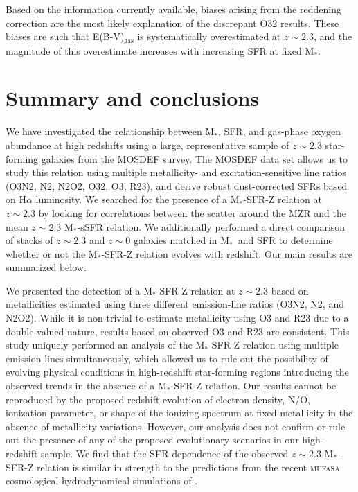 \documentclass[iop,twocolappendix]{emulateapj}
\newcommand{\mstar}{$\mbox{M}_*$}
\begin{document}
Based on the information currently available, biases arising from the reddening correction
 are the most likely explanation of the discrepant O32 results.  These biases are such that
 E(B-V)$_{\text{gas}}$ is systematically overestimated at $z\sim2.3$, and the magnitude of this overestimate
 increases with increasing SFR at fixed \mstar.

\section{Summary and conclusions}\label{sec5}

We have investigated the relationship between \mstar, SFR, and gas-phase oxygen abundance
 at high redshifts using a large, representative sample of $z\sim2.3$ star-forming galaxies from the
 MOSDEF survey.  The MOSDEF data set allows us to study this relation using multiple
 metallicity- and excitation-sensitive line ratios (O3N2, N2, N2O2, O32, O3, R23), and
 derive robust dust-corrected SFRs based on H$\alpha$ luminosity.
  We searched for the presence of a \mstar-SFR-Z relation at $z\sim2.3$ by looking for
 correlations between the scatter around the MZR and the mean $z\sim2.3$ \mstar-sSFR
 relation.  We additionally performed a direct comparison of stacks of $z\sim2.3$ and $z\sim0$
 galaxies matched in \mstar\ and SFR to determine whether or not the \mstar-SFR-Z relation
 evolves with redshift.  Our main results are summarized below.

We presented the detection of a \mstar-SFR-Z relation at $z\sim2.3$ based on
 metallicities estimated using three different emission-line ratios (O3N2, N2, and N2O2).
  While it is non-trivial to estimate metallicity using O3 and R23 due to a double-valued nature,
 results based on observed O3 and R23 are consistent.
  This study uniquely performed an analysis of the \mstar-SFR-Z relation using multiple
 emission lines simultaneously, which allowed us to rule out the possibility of evolving
 physical conditions in high-redshift star-forming regions introducing the observed trends
 in the absence of a \mstar-SFR-Z relation.  Our results cannot be reproduced by the
 proposed redshift evolution of electron density, N/O, ionization parameter, or shape of the
 ionizing spectrum at fixed metallicity in the absence of metallicity variations.
  However, our analysis does not confirm or rule out the presence of any of the proposed
 evolutionary scenarios in our high-redshift sample.
  We find that the SFR dependence of the observed $z\sim2.3$ \mstar-SFR-Z relation
 is similar in strength to the predictions from the recent \textsc{mufasa} cosmological
 hydrodynamical simulations of \citet{dav17}.
\end{document}
